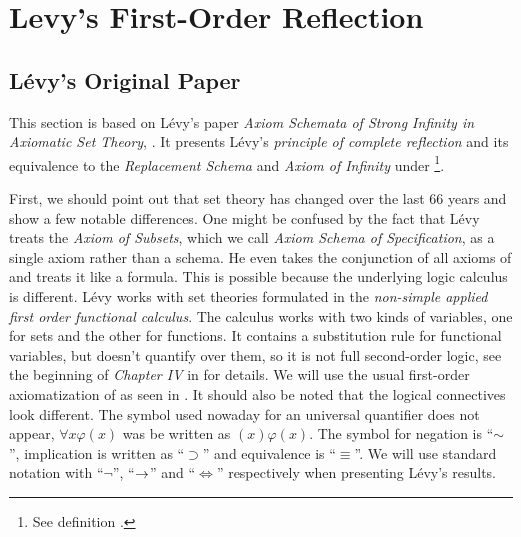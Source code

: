 \section{Levy's First-Order Reflection}\label{sec:first_order}

\subsection{Lévy's Original Paper}\label{sec:levy1960}
This section is based on Lévy's paper \emph{Axiom Schemata of Strong Infinity in Axiomatic Set Theory}, \cite{Levy60a}. It presents Lévy's \emph{principle of complete reflection}%
 and its equivalence to the \emph{Replacement Schema} and \emph{Axiom of Infinity} under \footnote{See definition .}.

First, we should point out that set theory has changed over the last 66 years and show a few notable differences.
One might be confused by the fact that Lévy treats the \emph{Axiom of Subsets}, which we call \emph{Axiom Schema of Specification}, as a single axiom rather than a schema. He even takes the conjunction of all axioms of  and treats it like a formula. This is possible because the underlying logic calculus is different. Lévy works with set theories formulated in the \emph{non-simple applied first order functional calculus}. The calculus works with two kinds of variables, one for sets and the other for functions. It contains a substitution rule for functional variables, but doesn't quantify over them, so it is not full second-order logic, see the beginning of \emph{Chapter IV} in \cite{church1996introduction} for details.%
We will use the usual first-order axiomatization of  as seen in \cite{JechBook}.
It should also be noted that the logical connectives look different. The symbol used nowaday for an universal quantifier does not appear, $\forall x \varphi (x)$ was be written as $(x) \varphi (x)$.
The symbol for negation is ``$\sim$'', implication is written as ``$\supset$'' and equivalence is ``$\equiv$''. We will use standard notation with ``$\neg$'', ``$\rightarrow$'' and ``$\iff$'' respectively when presenting Lévy's results.

